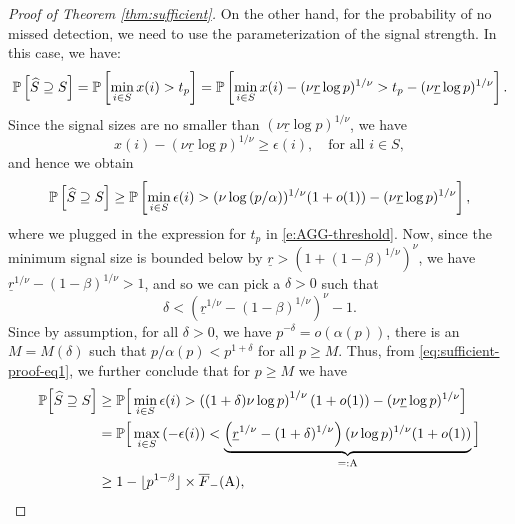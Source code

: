 \begin{proof}[Proof of Theorem \ref{thm:sufficient}]
On the other hand, for the probability of no missed detection, we need to use the parameterization of the signal strength.
In this case, we have:
\begin{equation*}
    \P\left[\widehat{S} \supseteq S\right] 
        = \P\left[\min_{i\in S}x(i) > t_p\right]
        = \P\left[\min_{i\in S}x(i) - (\nu\underline{r}\log p)^{1/\nu} > t_p - (\nu\underline{r}\log p)^{1/\nu} \right].
\end{equation*}
Since the signal sizes are no smaller than $(\nu\underline{r}\log p)^{1/\nu}$, we have
\begin{equation*}
    x(i) - \left(\nu\underline{r}\log{p}\right)^{1/\nu} \ge \epsilon(i), \quad \text{for all }i\in S,
\end{equation*}
and hence we obtain
\begin{equation} \label{eq:sufficient-proof-eq1}
    \P\left[\widehat{S} \supseteq S\right] \ge 
    \P\left[\min_{i\in S}\epsilon(i) > (\nu\log{(p/\alpha)})^{1/\nu}(1+o(1)) - (\nu\underline{r}\log p)^{1/\nu} \right],
\end{equation}
where we plugged in the expression for $t_p$ in \eqref{e:AGG-threshold}.
Now, since the minimum signal size is bounded below by $\underline{r} > \left(1 + (1-\beta)^{1/\nu}\right)^\nu$, we have $\underline{r}^{1/\nu}-(1-\beta)^{1/\nu}>1$, and so we can pick a $\delta > 0$ such that 
\begin{equation} \label{eq:choice-of-delta}
    \delta < \left(\underline{r}^{1/\nu} - (1-\beta)^{1/\nu}\right)^\nu - 1.
\end{equation}
Since by assumption, for all $\delta>0$, we have $p^{-\delta} = o\left(\alpha(p)\right)$, there is an
$M=M(\delta)$ such that $p/\alpha(p) < p^{1+\delta}$ for all $p\ge M$. Thus, from \eqref{eq:sufficient-proof-eq1}, we further conclude that for $p\ge M$ we have
\begin{align}
    \P\Big[\widehat{S} \supseteq S\Big]
      &\ge \P\Big[\min_{i\in S}\epsilon(i) > \left((1+\delta)\nu\log{p}\right)^{1/\nu}(1+o(1)) - (\nu\underline{r}\log p)^{1/\nu} \Big] \nonumber \\
      &= \P\Big[\max_{i\in S}\left(-\epsilon(i)\right) < \underbrace{\left(\underline{r}^{1/\nu} - (1+\delta)^{1/\nu}\right)(\nu\log{p})^{1/\nu}(1+o(1))}_{=:\text{A}} \Big] \nonumber \\
      &\ge 1 - \lfloor p^{1-\beta} \rfloor \times \overline{F}_-(\text{A}), \label{eq:sufficient-proof-eq2}

\end{align}
\end{proof}

